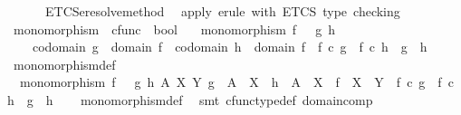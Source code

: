 \begin{isabellebody}
\ \ \ \ \ {\isachargreater}{\kern0pt}{\isachargreater}{\kern0pt}\ ETCS{\isacharunderscore}{\kern0pt}eresolve{\isacharunderscore}{\kern0pt}method{\isacartoucheclose}\isanewline
\ \ {\isachardoublequoteopen}apply\ erule\ with\ ETCS\ type\ checking{\isachardoublequoteclose}%
\endisatagML
{\isafoldML}%
%
\isadelimML
%
\endisadelimML
%
\isadelimdocument
%
\endisadelimdocument
%
\isatagdocument
%
\isamarkuptrue%
%
\isamarkuptrue%
%
\endisatagdocument
{\isafolddocument}%
%
\isadelimdocument
%
\endisadelimdocument
{}\isamarkupfalse%
\ monomorphism\ {\isacharcolon}{\kern0pt}{\isacharcolon}{\kern0pt}\ {\isachardoublequoteopen}cfunc\ {\isasymRightarrow}\ bool{\isachardoublequoteclose}\ \isanewline
\ \ {\isachardoublequoteopen}monomorphism\ f\ {\isasymlongleftrightarrow}\ {\isacharparenleft}{\kern0pt}{\isasymforall}\ g\ h{\isachardot}{\kern0pt}\ \isanewline
\ \ \ \ {\isacharparenleft}{\kern0pt}codomain\ g\ {\isacharequal}{\kern0pt}\ domain\ f\ {\isasymand}\ codomain\ h\ {\isacharequal}{\kern0pt}\ domain\ f{\isacharparenright}{\kern0pt}\ {\isasymlongrightarrow}\ {\isacharparenleft}{\kern0pt}f\ {\isasymcirc}\isactrlsub c\ g\ {\isacharequal}{\kern0pt}\ f\ {\isasymcirc}\isactrlsub c\ h\ {\isasymlongrightarrow}\ g\ {\isacharequal}{\kern0pt}\ h{\isacharparenright}{\kern0pt}{\isacharparenright}{\kern0pt}{\isachardoublequoteclose}\isanewline
\isanewline
{}\isamarkupfalse%
\ monomorphism{\isacharunderscore}{\kern0pt}def{}{\isacharcolon}{\kern0pt}\isanewline
\ \ {\isachardoublequoteopen}monomorphism\ f\ {\isasymlongleftrightarrow}\ {\isacharparenleft}{\kern0pt}{\isasymforall}\ g\ h\ A\ X\ Y{\isachardot}{\kern0pt}\ g\ {\isacharcolon}{\kern0pt}\ A\ {\isasymrightarrow}\ X\ {\isasymand}\ h\ {\isacharcolon}{\kern0pt}\ A\ {\isasymrightarrow}\ X\ {\isasymand}\ f\ {\isacharcolon}{\kern0pt}\ X\ {\isasymrightarrow}\ Y\ {\isasymlongrightarrow}\ {\isacharparenleft}{\kern0pt}f\ {\isasymcirc}\isactrlsub c\ g\ {\isacharequal}{\kern0pt}\ f\ {\isasymcirc}\isactrlsub c\ h\ {\isasymlongrightarrow}\ g\ {\isacharequal}{\kern0pt}\ h{\isacharparenright}{\kern0pt}{\isacharparenright}{\kern0pt}{\isachardoublequoteclose}\isanewline
%
\isadelimproof
\ \ %
\endisadelimproof
%
\isatagproof
{}\isamarkupfalse%
\ monomorphism{\isacharunderscore}{\kern0pt}def\ \isamarkupfalse%
\ {\isacharparenleft}{\kern0pt}smt\ cfunc{\isacharunderscore}{\kern0pt}type{\isacharunderscore}{\kern0pt}def\ domain{\isacharunderscore}{\kern0pt}comp{\isacharparenright}{\kern0pt}%

\end{isabellebody}
